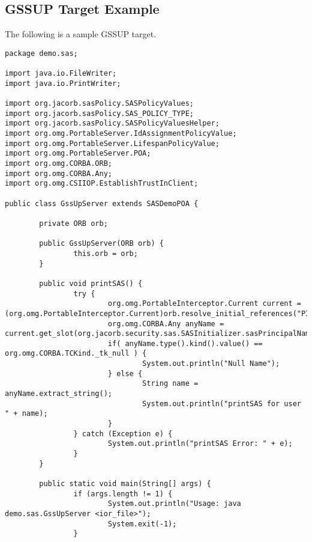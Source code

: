 \subsection{GSSUP Target Example}

The following is a sample GSSUP target.

\begin{scriptsize}
\begin{verbatim}
package demo.sas;

import java.io.FileWriter;
import java.io.PrintWriter;

import org.jacorb.sasPolicy.SASPolicyValues;
import org.jacorb.sasPolicy.SAS_POLICY_TYPE;
import org.jacorb.sasPolicy.SASPolicyValuesHelper;
import org.omg.PortableServer.IdAssignmentPolicyValue;
import org.omg.PortableServer.LifespanPolicyValue;
import org.omg.PortableServer.POA;
import org.omg.CORBA.ORB;
import org.omg.CORBA.Any;
import org.omg.CSIIOP.EstablishTrustInClient;

public class GssUpServer extends SASDemoPOA {

        private ORB orb;

        public GssUpServer(ORB orb) {
                this.orb = orb;
        }

        public void printSAS() {
                try {
                        org.omg.PortableInterceptor.Current current = (org.omg.PortableInterceptor.Current)orb.resolve_initial_references("PICurrent");
                        org.omg.CORBA.Any anyName = current.get_slot(org.jacorb.security.sas.SASInitializer.sasPrincipalNamePIC);
                        if( anyName.type().kind().value() == org.omg.CORBA.TCKind._tk_null ) {
                                System.out.println("Null Name");
                        } else {
                                String name = anyName.extract_string();
                                System.out.println("printSAS for user " + name);
                        }
                } catch (Exception e) {
                        System.out.println("printSAS Error: " + e);
                }
        }

        public static void main(String[] args) {
                if (args.length != 1) {
                        System.out.println("Usage: java demo.sas.GssUpServer <ior_file>");
                        System.exit(-1);
                }


\end{verbatim}
\end{scriptsize}
